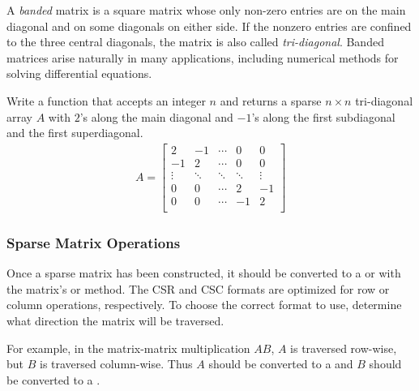 \begin{info} %
A \emph{banded} matrix is a square matrix whose only non-zero entries are on the main diagonal and on some diagonals on either side.
If the nonzero entries are confined to the three central diagonals, the matrix is also called \emph{tri-diagonal}.
Banded matrices arise naturally in many applications, including numerical methods for solving differential equations.
\end{info}

\begin{problem} %
Write a function that accepts an integer $n$ and returns a sparse $n\times n$
tri-diagonal array $A$ with $2$'s along the main diagonal and $-1$'s along
the first subdiagonal and the first superdiagonal.
%
\begin{align*}
A =
\left[\begin{array}{rrrrr}
 2 & -1 & \cdots &  0 &  0 \\
-1 &  2 & \cdots &  0 &  0 \\
\vdots & \ddots & \ddots & \ddots & \vdots \\
 0 &  0 & \cdots &  2 & -1 \\
 0 &  0 & \cdots & -1 &  2 \\
\end{array}\right]
\end{align*}
%
\label{prob:sparse-tridiag-construction}
\end{problem}

\subsubsection*{Sparse Matrix Operations} %

Once a sparse matrix has been constructed, it should be converted to a  or  with the matrix's  or  method.
The CSR and CSC formats are optimized for row or column operations, respectively.
To choose the correct format to use, determine what direction the matrix will be traversed.%

For example, in the matrix-matrix multiplication $AB$, $A$ is traversed row-wise, but $B$ is traversed column-wise.
Thus $A$ should be converted to a  and $B$ should be converted to a .

